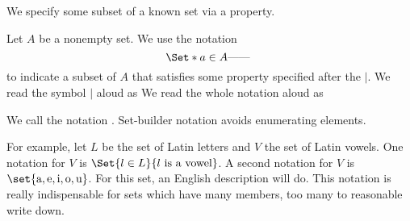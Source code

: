
\sbasic



\sstart



We specify some
subset of a known
set via a property.



Let $A$ be a nonempty set.
We use the notation
\[
  \Set*{a \in A}{\text{------}\;}
\]
to indicate a subset of $A$ that
satisfies some property specified
after the $\mid$.
We read the symbol $\mid$ aloud as
We read the whole notation aloud as

We call the notation
.
Set-builder notation avoids enumerating
elements.


For example, let $L$
be the set of Latin letters
and $V$ the set of Latin
vowels.
One notation for $V$ is
$\Set{l \in L}{l \text{ is a vowel}}$.
A second notation for $V$ is
$\set{\text{a},\text{e},\text{i},\text{o},\text{u}}$.
For this set, an English description will do.
This notation is really indispensable for
sets which have many members, too many
to reasonable write down.


\strats
